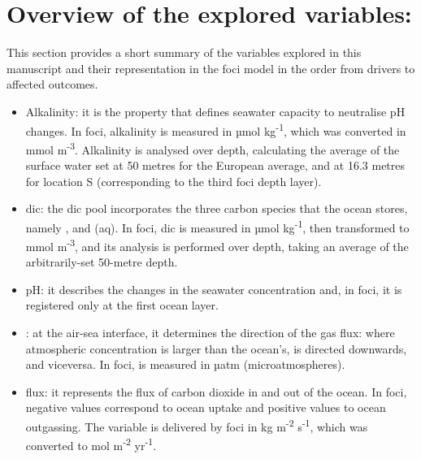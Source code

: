 \section{Overview of the explored variables:}

This section provides a short summary of the variables explored in this manuscript and their representation in the \ac{foci} model in the order from drivers to affected outcomes.

\begin{itemize}
    \item Alkalinity: it is the property that defines seawater capacity to neutralise pH changes. In \ac{foci}, alkalinity is measured in µmol kg\textsuperscript{-1}, which was converted in mmol m\textsuperscript{-3}. Alkalinity is analysed over depth, calculating the average of the surface water set at 50 metres for the European average, and at 16.3 metres for location S (corresponding to the third \ac{foci} depth layer).
    \item \ac{dic}: the \ac{dic} pool incorporates the three carbon species that the ocean stores, namely ,  and (aq). In \ac{foci}, \ac{dic} is measured in µmol kg\textsuperscript{-1}, then transformed to mmol m\textsuperscript{-3}, and its analysis is performed over depth, taking an average of the arbitrarily-set 50-metre depth.
    \item pH: it describes the changes in the seawater  concentration and, in \ac{foci}, it is registered only at the first ocean layer. 
    \item {}: at the air-sea interface, it determines the direction of the gas flux: where atmospheric  concentration is larger than the ocean's,  is directed downwards, and viceversa. In \ac{foci},  is measured in µatm (microatmospheres).
    \item {} flux: it represents the flux of carbon dioxide in and out of the ocean. In \ac{foci}, negative values correspond to ocean uptake and positive values to ocean outgassing. The variable is delivered by \ac{foci} in kg m\textsuperscript{-2} s\textsuperscript{-1}, which was converted to mol m\textsuperscript{-2} yr\textsuperscript{-1}.
\end{itemize}














